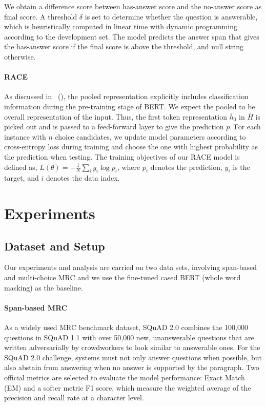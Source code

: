 \documentclass[letterpaper]{article} \usepackage{color}
\begin{document}
We obtain a difference score between has-answer score and the no-answer score as final score. A threshold $\delta$ is set to determine whether the question is answerable, which is heuristically computed in linear time with dynamic programming according to the development set. The model predicts the answer span that gives the has-answer score if the final score is above the threshold, and null string otherwise.

\paragraph{RACE}
As discussed in \citeauthor{devlin2018bert}~(\citeyear{devlin2018bert}), the pooled representation explicitly includes classification information during the pre-training stage of BERT. We expect the pooled to be overall representation of the input. Thus, the first token representation $\bar h_0$ in $\bar H$ is picked out and is passed to a feed-forward layer to give the prediction $p$. For each instance with $n$ choice candidates, we update model parameters according to cross-entropy loss during training and choose the one with highest probability as the prediction when testing. 
The training objectives of our RACE model is defined as, $L(\theta) = -\frac{1}{N}\sum_i y_i \log{p}_i$, where $p_{i}$ denotes the prediction, $y_{i}$ is the target, and $i$ denotes the data index.


\section{Experiments}
\subsection{Dataset and Setup}
Our experiments and analysis are carried on two data sets, involving span-based and multi-choice MRC and we use the fine-tuned cased BERT (whole word masking) as the baseline. 
\paragraph{Span-based MRC} As a widely used MRC benchmark dataset, SQuAD 2.0  \cite{Rajpurkar2018Know} combines the 100,000 questions in SQuAD 1.1 \cite{Rajpurkar2016SQuAD} with over 50,000 new, unanswerable questions that are written adversarially by crowdworkers to look similar to answerable ones. For the SQuAD 2.0 challenge, systems must not only answer questions when possible, but also abstain from answering when no answer is supported by the paragraph. Two official metrics are selected to evaluate the model performance: Exact Match (EM) and a softer metric F1 score, which measure the weighted average of the precision and recall rate at a character level.
\end{document}
